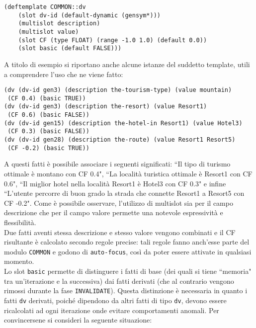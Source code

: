 \lstset{numbers=left,breaklines=true,language=C,basicstyle=\small\ttfamily}
\begin{lstlisting}[frame=single]
(deftemplate COMMON::dv 
    (slot dv-id (default-dynamic (gensym*)))
    (multislot description)
    (multislot value)
    (slot CF (type FLOAT) (range -1.0 1.0) (default 0.0))
    (slot basic (default FALSE)))   
\end{lstlisting}

A titolo di esempio si riportano anche alcune istanze del suddetto template, utili a comprendere l'uso che ne viene fatto: 

\begin{lstlisting}[frame=single]
(dv (dv-id gen3) (description the-tourism-type) (value mountain)
 (CF 0.4) (basic TRUE))
(dv (dv-id gen3) (description the-resort) (value Resort1)
 (CF 0.6) (basic FALSE))
(dv (dv-id gen15) (description the-hotel-in Resort1) (value Hotel3)
 (CF 0.3) (basic FALSE))
(dv (dv-id gen28) (description the-route) (value Resort1 Resort5) 
 (CF -0.2) (basic TRUE))
\end{lstlisting}

A questi fatti è possibile associare i seguenti significati: ``Il tipo di turismo ottimale è montano con CF 0.4", ``La località turistica ottimale è Resort1 con CF 0.6", ``Il miglior hotel nella località Resort1 è Hotel3 con CF 0.3" e infine ``L'utente percorre di buon grado la strada che connette Resort1 a Resort5 con CF -0.2". Come è possibile osservare, l'utilizzo di multislot sia per il campo descrizione che per il campo valore permette una notevole espressività e flessibilità.\\
Due fatti aventi stessa descrizione e stesso valore vengono combinati e il CF risultante è calcolato secondo regole precise: tali regole fanno anch'esse parte del modulo \texttt{COMMON} e godono di \texttt{auto-focus}, così da poter essere attivate in qualsiasi momento.\\
Lo slot \texttt{basic} permette di distinguere i fatti di base (dei quali si tiene ``memoria" tra un'iterazione e la successiva) dai fatti derivati (che al contrario vengono rimossi durante la fase \texttt{INVALIDATE}). Questa distinzione è necessaria in quanto i fatti \texttt{dv} derivati, poiché dipendono da altri fatti di tipo \texttt{dv}, devono essere ricalcolati ad ogni iterazione onde evitare comportamenti anomali. Per convincersene si consideri la seguente situazione:

